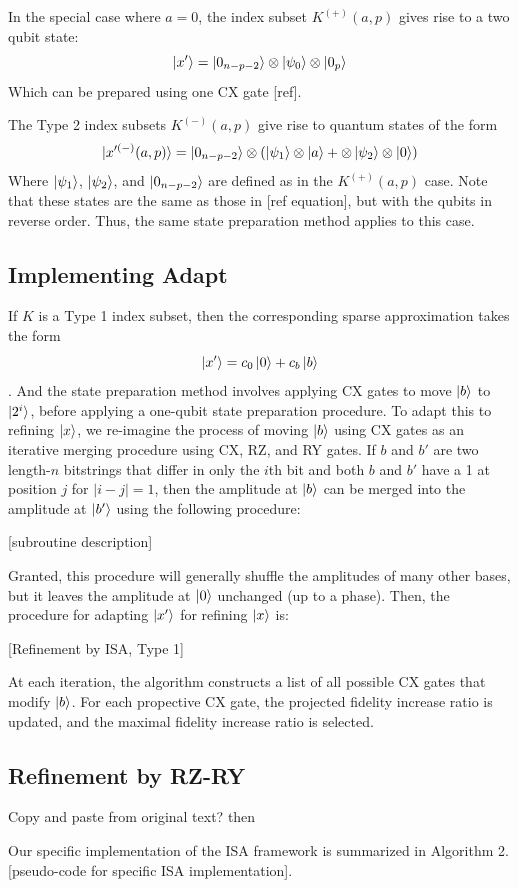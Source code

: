 \documentclass{article}
\begin{document}
In the special case where $a = 0$, the index subset $K^{(+)}(a, p)$ gives rise
to a two qubit state:
$$\mathinner{|{x'}\rangle} = \mathinner{|{0_{n - p - 2}}\rangle} \otimes \mathinner{|{\psi_0}\rangle} \otimes \mathinner{|{0_p}\rangle}$$
Which can be prepared using one CX gate [ref].

The Type 2 index subsets $K^{(-)}(a, p)$ give rise to quantum states of the form
$$\mathinner{|{x'^{(-)}(a, p)}\rangle} = \mathinner{|{0_{n-p-2}}\rangle} \otimes (\mathinner{|{\psi_1}\rangle} \otimes \mathinner{|{a}\rangle} + \otimes \mathinner{|{\psi_2}\rangle} \otimes \mathinner{|{0}\rangle})$$
Where $\mathinner{|{\psi_1}\rangle}$, $\mathinner{|{\psi_2}\rangle}$, and $\mathinner{|{0_{n-p-2}}\rangle}$ are defined as in
the $K^{(+)}(a, p)$ case. Note that these states are the same as those in 
[ref equation], but with the qubits in reverse order. Thus, the same state
preparation method applies to this case.
\subsection{Implementing Adapt}
If $K$ is a Type 1 index subset, then the corresponding sparse approximation
takes the form
$$\mathinner{|{x'}\rangle} = c_0\mathinner{|{0}\rangle} + c_b\mathinner{|{b}\rangle}$$.
And the state preparation method involves applying CX gates to move $\mathinner{|{b}\rangle}$ to
$\mathinner{|{2^i}\rangle}$, before applying a one-qubit state preparation procedure. To adapt
this to refining $\mathinner{|{x}\rangle}$, we re-imagine the process of moving $\mathinner{|{b}\rangle}$ using
CX gates as an iterative merging procedure using CX, RZ, and RY gates. If $b$
and $b'$ are two length-$n$ bitstrings that differ in only the $i$th bit and
both $b$ and $b'$ have a 1 at position $j$ for $|i - j| = 1$, then
the amplitude at $\mathinner{|{b}\rangle}$ can be merged into the amplitude at $\mathinner{|{b'}\rangle}$ using
the following procedure:

[subroutine description]

Granted, this procedure will generally shuffle the amplitudes of many other
bases, but it leaves the amplitude at $\mathinner{|{0}\rangle}$ unchanged (up to a phase). Then,
the procedure for adapting $\mathinner{|{x'}\rangle}$ for refining $\mathinner{|{x}\rangle}$ is:

[Refinement by ISA, Type 1]

At each iteration, the algorithm constructs a list of all possible CX gates that
modify $\mathinner{|{b}\rangle}$. For each propective CX gate, the projected fidelity increase
ratio is updated, and the maximal fidelity increase ratio is selected.

\subsection{Refinement by RZ-RY}
Copy and paste from original text?
then

Our specific implementation of the ISA framework is summarized in Algorithm 2.
[pseudo-code for specific ISA implementation].
\end{document}
